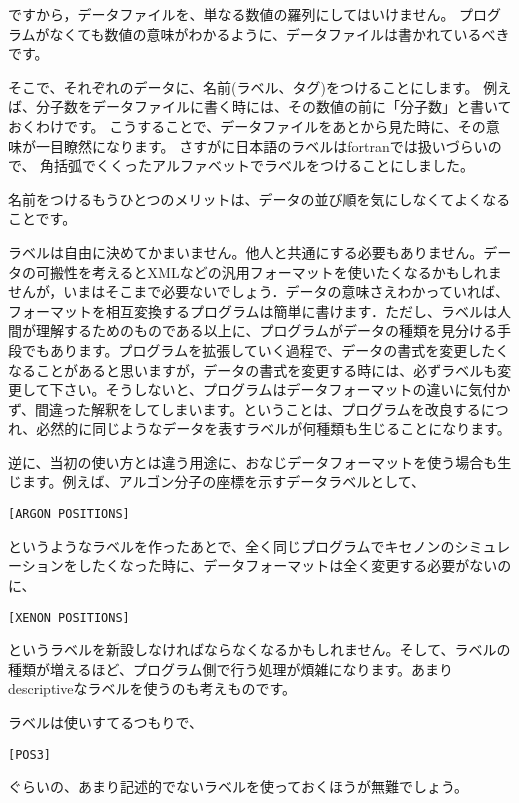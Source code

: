 \documentclass[a4,10pt]{article}
\begin{document}
ですから，データファイルを、単なる数値の羅列にしてはいけません。
プログラムがなくても数値の意味がわかるように、データファイルは書かれているべきです。

そこで、それぞれのデータに、名前(ラベル、タグ)をつけることにします。
例えば、分子数をデータファイルに書く時には、その数値の前に「分子数」と書いておくわけです。
こうすることで、データファイルをあとから見た時に、その意味が一目瞭然になります。
さすがに日本語のラベルはfortranでは扱いづらいので、
角括弧でくくったアルファベットでラベルをつけることにしました。

名前をつけるもうひとつのメリットは、データの並び順を気にしなくてよくなることです。

ラベルは自由に決めてかまいません。他人と共通にする必要もありません。データの可搬性を考えるとXMLなどの汎用フォーマットを使いたくなるかもしれませんが，いまはそこまで必要ないでしょう．データの意味さえわかっていれば、フォーマットを相互変換するプログラムは簡単に書けます．ただし、ラベルは人間が理解するためのものである以上に、プログラムがデータの種類を見分ける手段でもあります。プログラムを拡張していく過程で、データの書式を変更したくなることがあると思いますが，データの書式を変更する時には、必ずラベルも変更して下さい。そうしないと、プログラムはデータフォーマットの違いに気付かず、間違った解釈をしてしまいます。ということは、プログラムを改良するにつれ、必然的に同じようなデータを表すラベルが何種類も生じることになります。

逆に、当初の使い方とは違う用途に、おなじデータフォーマットを使う場合も生じます。例えば、アルゴン分子の座標を示すデータラベルとして、
\begin{screen}\begin{verbatim}
[ARGON POSITIONS]
\end{verbatim}\end{screen}
というようなラベルを作ったあとで、全く同じプログラムでキセノンのシミュレーションをしたくなった時に、データフォーマットは全く変更する必要がないのに、
\begin{screen}\begin{verbatim}
[XENON POSITIONS]
\end{verbatim}\end{screen}
というラベルを新設しなければならなくなるかもしれません。そして、ラベルの種類が増えるほど、プログラム側で行う処理が煩雑になります。あまりdescriptiveなラベルを使うのも考えものです。

ラベルは使いすてるつもりで、
\begin{screen}\begin{verbatim}
[POS3]
\end{verbatim}\end{screen}
ぐらいの、あまり記述的でないラベルを使っておくほうが無難でしょう。
\end{document}
